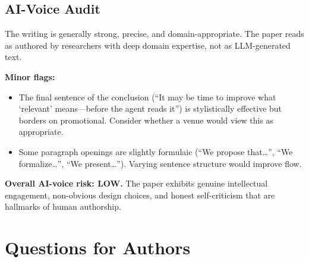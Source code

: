 \documentclass[11pt,a4paper]{article}
\begin{document}
\subsection{AI-Voice Audit}

The writing is generally strong, precise, and domain-appropriate. The paper reads as authored by researchers with deep domain expertise, not as LLM-generated text.

\textbf{Minor flags:}
\begin{itemize}[nosep]
\item The final sentence of the conclusion (``It may be time to improve what `relevant' means---before the agent reads it'') is stylistically effective but borders on promotional. Consider whether a venue would view this as appropriate.
\item Some paragraph openings are slightly formulaic (``We propose that\ldots'', ``We formalize\ldots'', ``We present\ldots''). Varying sentence structure would improve flow.
\end{itemize}

\textbf{Overall AI-voice risk: LOW.} The paper exhibits genuine intellectual engagement, non-obvious design choices, and honest self-criticism that are hallmarks of human authorship.

\section{Questions for Authors}
\end{document}
